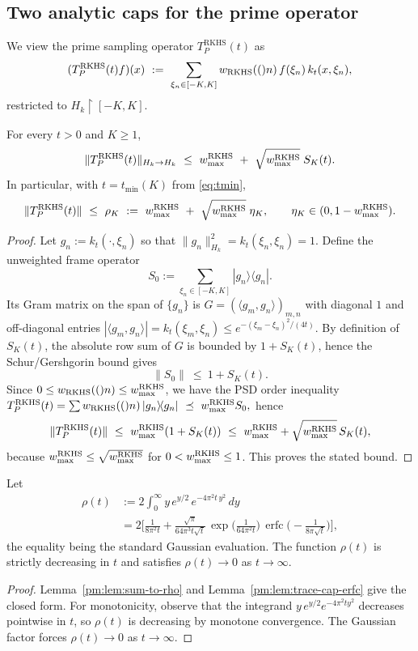 \subsection*{Two analytic caps for the prime operator}

We view the prime sampling operator $T_P^{\mathrm{RKHS}}(t)$ as
\[
(T_P^{\mathrm{RKHS}}(t) f)(x)\ :=\ \sum_{\xi_n\in[-K,K]} \wRKHS(n)\, f(\xi_n)\, k_t(x,\xi_n),
\]
restricted to $H_k\!\restriction[-K,K]$.

\begin{proposition}\label{prop:rkhs-gram-cap}
For every $t>0$ and $K\ge1$,
\[
\|T_P^{\mathrm{RKHS}}(t)\|_{H_k\to H_k}\ \le\ \wmax\ +\ \sqrt{\wmax}\; S_K(t).
\]
In particular, with $t=t_{\min}(K)$ from \eqref{eq:tmin},
\begin{equation}\label{eq:rhoK-eta}
\|T_P^{\mathrm{RKHS}}(t)\|\ \le\ \rho_K\ :=\ \wmax\ +\ \sqrt{\wmax}\;\eta_K,
\qquad \eta_K\in(0,1-\wmax).
\end{equation}
\end{proposition}

\begin{proof}
Let $g_n:=k_t(\cdot,\xi_n)$ so that $\|g_n\|_{H_k}^2=k_t(\xi_n,\xi_n)=1$. Define the unweighted frame operator
\[
S_0:=\sum_{\xi_n\in[-K,K]} |g_n\rangle\!\langle g_n|.
\]
Its Gram matrix on the span of $\{g_n\}$ is $G=(\langle g_m,g_n\rangle)_{m,n}$ with diagonal $1$ and off-diagonal entries
$|\langle g_m,g_n\rangle|=k_t(\xi_m,\xi_n)\le e^{-(\xi_m-\xi_n)^2/(4t)}$. By definition of $S_K(t)$,
the absolute row sum of $G$ is bounded by $1+S_K(t)$, hence the Schur/Gershgorin bound gives
\[
\|S_0\|\ \le\ 1+S_K(t).
\]
Since $0\le w_{\mathrm{RKHS}}(()n)\le w_{\max}^{\mathrm{RKHS}}$, we have the PSD order inequality
\(
T_P^{\mathrm{RKHS}}(t)=\sum w_{\mathrm{RKHS}}(()n)\,|g_n\rangle\!\langle g_n|\ \preceq\ w_{\max}^{\mathrm{RKHS}} S_0,
\)
hence
\[
\|T_P^{\mathrm{RKHS}}(t)\|\ \le\ \wmax(1+S_K(t))
\ \le\ \wmax+\sqrt{\wmax}\,S_K(t),
\]
because $w_{\max}^{\mathrm{RKHS}}\le\sqrt{w_{\max}^{\mathrm{RKHS}}}$ for $0<w_{\max}^{\mathrm{RKHS}}\le1$. This proves the stated bound.
\end{proof}

\begin{lemma}\label{lem:rkhs-uniform-cap-full}\label{lem:prime-cap-uniform}
Let
\[
\begin{aligned}
  \rho(t) &:= 2\int_{0}^{\infty} y\,e^{y/2}\,e^{-4\pi^2 t\,y^2}\,dy \\
          &= 2\Bigg[\frac{1}{8\pi^2 t}
              + \frac{\sqrt{\pi}}{64\pi^3 t\sqrt{t}}\,
                \exp\!\Big(\frac{1}{64\pi^2 t}\Big)\,
                \operatorname{erfc}\!\Big(-\frac{1}{8\pi\sqrt{t}}\Big)\Bigg],
\end{aligned}
\]
the equality being the standard Gaussian evaluation. The function $\rho(t)$ is strictly decreasing in $t$ and
satisfies $\rho(t)\to0$ as $t\to\infty$.
\end{lemma}
\begin{proof}
Lemma~\ref{pm:lem:sum-to-rho} and Lemma~\ref{pm:lem:trace-cap-erfc} give the closed form.
For monotonicity, observe that the integrand $y\,e^{y/2}e^{-4\pi^2 t y^2}$ decreases pointwise in $t$,
so $\rho(t)$ is decreasing by monotone convergence. The Gaussian factor forces $\rho(t)\to0$ as $t\to\infty$.
\end{proof}

